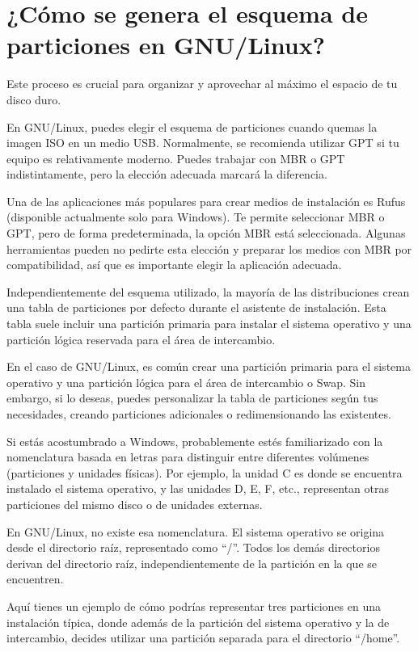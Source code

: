 \documentclass[
  jou,
  floatsintext,
  longtable,
  a4paper,
  nolmodern,
  notxfonts,
  notimes,
  12pt,
  colorlinks=true,linkcolor=blue,citecolor=blue,urlcolor=blue]{apa7}
\begin{document}
\section{¿Cómo se genera el esquema de particiones en
GNU/Linux?}\label{cuxf3mo-se-genera-el-esquema-de-particiones-en-gnulinux}

Este proceso es crucial para organizar y aprovechar al máximo el espacio
de tu disco duro.

En GNU/Linux, puedes elegir el esquema de particiones cuando quemas la
imagen ISO en un medio USB. Normalmente, se recomienda utilizar GPT si
tu equipo es relativamente moderno. Puedes trabajar con MBR o GPT
indistintamente, pero la elección adecuada marcará la diferencia.

Una de las aplicaciones más populares para crear medios de instalación
es Rufus (disponible actualmente solo para Windows). Te permite
seleccionar MBR o GPT, pero de forma predeterminada, la opción MBR está
seleccionada. Algunas herramientas pueden no pedirte esta elección y
preparar los medios con MBR por compatibilidad, así que es importante
elegir la aplicación adecuada.

Independientemente del esquema utilizado, la mayoría de las
distribuciones crean una tabla de particiones por defecto durante el
asistente de instalación. Esta tabla suele incluir una partición
primaria para instalar el sistema operativo y una partición lógica
reservada para el área de intercambio.

En el caso de GNU/Linux, es común crear una partición primaria para el
sistema operativo y una partición lógica para el área de intercambio o
Swap. Sin embargo, si lo deseas, puedes personalizar la tabla de
particiones según tus necesidades, creando particiones adicionales o
redimensionando las existentes.

Si estás acostumbrado a Windows, probablemente estés familiarizado con
la nomenclatura basada en letras para distinguir entre diferentes
volúmenes (particiones y unidades físicas). Por ejemplo, la unidad C es
donde se encuentra instalado el sistema operativo, y las unidades D, E,
F, etc., representan otras particiones del mismo disco o de unidades
externas.

En GNU/Linux, no existe esa nomenclatura. El sistema operativo se
origina desde el directorio raíz, representado como ``/''. Todos los
demás directorios derivan del directorio raíz, independientemente de la
partición en la que se encuentren.

Aquí tienes un ejemplo de cómo podrías representar tres particiones en
una instalación típica, donde además de la partición del sistema
operativo y la de intercambio, decides utilizar una partición separada
para el directorio ``/home''.
\end{document}
